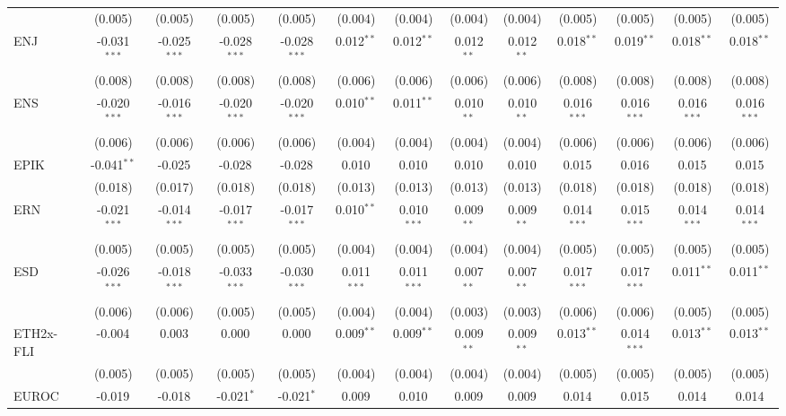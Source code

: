 \begin{table}[!htbp]
\begin{tabular}{@{\extracolsep{5pt}}lcccccccccccc}
  & (0.005) & (0.005) & (0.005) & (0.005) & (0.004) & (0.004) & (0.004) & (0.004) & (0.005) & (0.005) & (0.005) & (0.005) \\
 ENJ & -0.031$^{***}$ & -0.025$^{***}$ & -0.028$^{***}$ & -0.028$^{***}$ & 0.012$^{**}$ & 0.012$^{**}$ & 0.012$^{**}$ & 0.012$^{**}$ & 0.018$^{**}$ & 0.019$^{**}$ & 0.018$^{**}$ & 0.018$^{**}$ \\
  & (0.008) & (0.008) & (0.008) & (0.008) & (0.006) & (0.006) & (0.006) & (0.006) & (0.008) & (0.008) & (0.008) & (0.008) \\
 ENS & -0.020$^{***}$ & -0.016$^{***}$ & -0.020$^{***}$ & -0.020$^{***}$ & 0.010$^{**}$ & 0.011$^{**}$ & 0.010$^{**}$ & 0.010$^{**}$ & 0.016$^{***}$ & 0.016$^{***}$ & 0.016$^{***}$ & 0.016$^{***}$ \\
  & (0.006) & (0.006) & (0.006) & (0.006) & (0.004) & (0.004) & (0.004) & (0.004) & (0.006) & (0.006) & (0.006) & (0.006) \\
 EPIK & -0.041$^{**}$ & -0.025$^{}$ & -0.028$^{}$ & -0.028$^{}$ & 0.010$^{}$ & 0.010$^{}$ & 0.010$^{}$ & 0.010$^{}$ & 0.015$^{}$ & 0.016$^{}$ & 0.015$^{}$ & 0.015$^{}$ \\
  & (0.018) & (0.017) & (0.018) & (0.018) & (0.013) & (0.013) & (0.013) & (0.013) & (0.018) & (0.018) & (0.018) & (0.018) \\
 ERN & -0.021$^{***}$ & -0.014$^{***}$ & -0.017$^{***}$ & -0.017$^{***}$ & 0.010$^{**}$ & 0.010$^{***}$ & 0.009$^{**}$ & 0.009$^{**}$ & 0.014$^{***}$ & 0.015$^{***}$ & 0.014$^{***}$ & 0.014$^{***}$ \\
  & (0.005) & (0.005) & (0.005) & (0.005) & (0.004) & (0.004) & (0.004) & (0.004) & (0.005) & (0.005) & (0.005) & (0.005) \\
 ESD & -0.026$^{***}$ & -0.018$^{***}$ & -0.033$^{***}$ & -0.030$^{***}$ & 0.011$^{***}$ & 0.011$^{***}$ & 0.007$^{**}$ & 0.007$^{**}$ & 0.017$^{***}$ & 0.017$^{***}$ & 0.011$^{**}$ & 0.011$^{**}$ \\
  & (0.006) & (0.006) & (0.005) & (0.005) & (0.004) & (0.004) & (0.003) & (0.003) & (0.006) & (0.006) & (0.005) & (0.005) \\
 ETH2x-FLI & -0.004$^{}$ & 0.003$^{}$ & 0.000$^{}$ & 0.000$^{}$ & 0.009$^{**}$ & 0.009$^{**}$ & 0.009$^{**}$ & 0.009$^{**}$ & 0.013$^{**}$ & 0.014$^{***}$ & 0.013$^{**}$ & 0.013$^{**}$ \\
  & (0.005) & (0.005) & (0.005) & (0.005) & (0.004) & (0.004) & (0.004) & (0.004) & (0.005) & (0.005) & (0.005) & (0.005) \\
 EUROC & -0.019$^{}$ & -0.018$^{}$ & -0.021$^{*}$ & -0.021$^{*}$ & 0.009$^{}$ & 0.010$^{}$ & 0.009$^{}$ & 0.009$^{}$ & 0.014$^{}$ & 0.015$^{}$ & 0.014$^{}$ & 0.014$^{}$ \\

\end{tabular}
\end{table}
